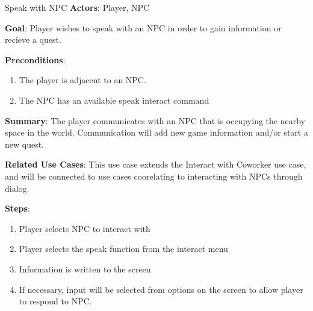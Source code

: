 \begin{subsection}{Speak with NPC}
\textbf{Actors}:
Player, NPC

\textbf{Goal}:
Player wishes to speak with an NPC in order to gain information or recieve 
a quest.

\textbf{Preconditions}:
\begin{enumerate}
\item The player is adjacent to an NPC.
\item The NPC has an available speak interact command
\end{enumerate}

\textbf{Summary}:
The player communicates with an NPC that is occupying the nearby space 
in the world. Communication will add new game information and/or start
a new quest.

\textbf{Related Use Cases}:
This use case extends the Interact with Coworker use case, and will be 
connected to use cases coorelating to interacting with NPCs through 
dialog.

\textbf{Steps}:
\begin{enumerate}
\item Player selects NPC to interact with
\item Player selects the speak function from the interact menu
\item Information is written to the screen
\item If necessary, input will be selected from options on the screen
	to allow player to respond to NPC.
\end{enumerate}
\end{subsection}



